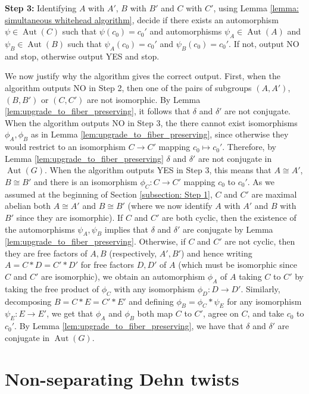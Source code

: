 \documentclass{amsart}
\DeclareMathOperator{\Aut}{Aut}
\theoremstyle{plain}
\theoremstyle{definition}
\theoremstyle{remark}
\begin{document}
\textbf{Step 3:} Identifying $A$ with $A'$, $B$ with $B'$ and $C$ with $C'$, using Lemma \ref{lemma: simultaneous whitehead algorithm}, decide if there exists an automorphism $\psi \in \Aut(C)$ such that $\psi(c_0) = c_0'$ and automorphisms $\psi_A \in \Aut(A)$ and $\psi_B \in \Aut(B)$ such that $\psi_A(c_0) = c_0'$ and $\psi_B(c_0) = c_0'$. If not, output NO and stop, otherwise output YES and stop. 

We now justify why the algorithm gives the correct output. First, when the algorithm outputs NO in Step 2, then one of the pairs of subgroups $(A,A')$, $(B,B')$ or $(C,C')$ are not isomorphic. By Lemma \ref{lem:upgrade_to_fiber_preserving}, it follows that $\delta$ and $\delta'$ are not conjugate. When the algorithm outputs NO in Step 3, the there cannot exist isomorphisms $\phi_A, \phi_B$ as in Lemma \ref{lem:upgrade_to_fiber_preserving}, since otherwise they would restrict to an isomorphism $C \to C'$ mapping $c_0 \mapsto c_0'$. Therefore, by Lemma \ref{lem:upgrade_to_fiber_preserving} $\delta$ and $\delta'$ are not conjugate in $\Aut(G)$. When the algorithm outputs YES in Step 3, this means that $A \cong A'$, $B \cong B'$ and there is an isomorphism $\phi_C:C \to C'$ mapping $c_0$ to $c_0'$. As we assumed at the beginning of Section \ref{subsection: Step 1}, $C$ and $C'$ are maximal abelian both $A \cong A'$ and $B \cong B'$ (where we now identify $A$ with $A'$ and $B$ with $B'$ since they are isomorphic). If $C$ and $C'$ are both cyclic, then the existence of the automorphisms $\psi_A, \psi_B$ implies that $\delta$ and $\delta'$ are conjugate by Lemma \ref{lem:upgrade_to_fiber_preserving}. Otherwise, if $C$ and $C'$ are not cyclic, then they are free factors of $A,B$ (respectively, $A',B'$) and hence writing $A = C * D = C' * D'$ for free factors $D,D'$ of $A$ (which must be isomorphic since $C$ and $C'$ are isomorphic), we obtain an automorphism $\phi_A$ of $A$ taking $C$ to $C'$ by taking the free product of $\phi_C$ with any isomorphism $\phi_D:D \to D'$. Similarly, decomposing $B = C * E = C' * E'$ and defining $\phi_B = \phi_C * \psi_E$ for any isomorphism $\psi_E : E \to E'$, we get that $\phi_A$ and $\phi_B$ both map $C$ to $C'$, agree on $C$, and take $c_0$ to $c_0'$. By Lemma \ref{lem:upgrade_to_fiber_preserving}, we have that $\delta$ and $\delta'$ are conjugate in $\Aut(G)$. 


\section{Non-separating Dehn twists}\label{section: non-separating Dehn twists}
\end{document}
